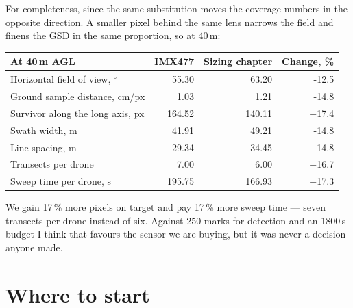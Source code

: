 \documentclass[11pt,a4paper]{article}
\begin{document}
For completeness, since the same substitution moves the coverage numbers in the
opposite direction. A smaller pixel behind the same lens narrows the field and
finens the GSD in the same proportion, so at 40\,m:

\begin{center}
\begin{tabular}{l r r r}
\toprule
At 40\,m AGL & \textbf{IMX477} & \textbf{Sizing chapter} & \textbf{Change, \%} \\
\midrule
Horizontal field of view, $^\circ$ & 55.30 & 63.20 & -12.5 \\
Ground sample distance, cm/px & 1.03 & 1.21 & -14.8 \\
Survivor along the long axis, px & 164.52 & 140.11 & +17.4 \\
Swath width, m & 41.91 & 49.21 & -14.8 \\
Line spacing, m & 29.34 & 34.45 & -14.8 \\
Transects per drone & 7.00 & 6.00 & +16.7 \\
Sweep time per drone, s & 195.75 & 166.93 & +17.3 \\
\bottomrule
\end{tabular}
\end{center}

We gain 17\,\% more pixels on target and pay 17\,\% more
sweep time --- seven transects per drone instead of six. Against 250 marks for
detection and an 1800\,s budget I think that favours the sensor we are buying,
but it was never a decision anyone made.

\section{Where to start}
\end{document}
